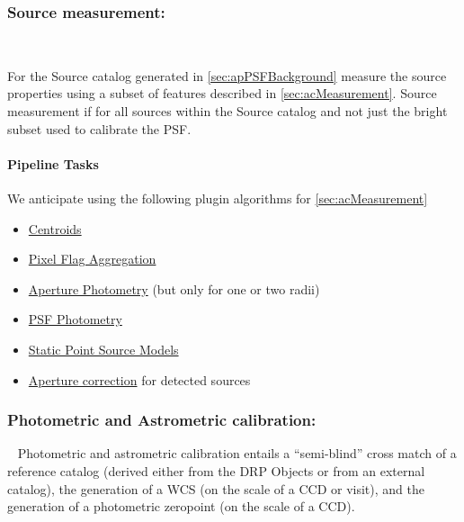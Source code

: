 \subsubsection{Source measurement:}~
\label{sec:apSourcemeasurement}

For the Source catalog generated in \ref{sec:apPSFBackground} measure the source properties using a subset of features described in \ref{sec:acMeasurement}. Source measurement if for all sources within the Source catalog and not just the bright subset used to calibrate the PSF. 

\paragraph{Pipeline Tasks}
We anticipate using the following plugin algorithms for \ref{sec:acMeasurement}
\begin{itemize}
\item \hyperref[sec:acCentroidAlgorithms]{Centroids}
\item \hyperref[sec:acPixelFlags]{Pixel Flag Aggregation}
\item \hyperref[sec:acAperturePhotometry]{Aperture Photometry} (but only for one or two radii) 
\item \hyperref[sec:acPSFPhotometry]{PSF Photometry} 
\item \hyperref[sec:acStaticPointSourceModels]{Static Point Source Models}
\item  \hyperref[sec:apertureCorrection]{Aperture correction} for  detected sources
\end{itemize}

\subsubsection{Photometric and Astrometric calibration:}~
Photometric and astrometric calibration entails a ``semi-blind'' cross match of a reference catalog (derived either from the DRP Objects or from an external catalog), the generation of a WCS (on the scale of a CCD or visit), and the generation of a photometric zeropoint (on the scale of a CCD).

